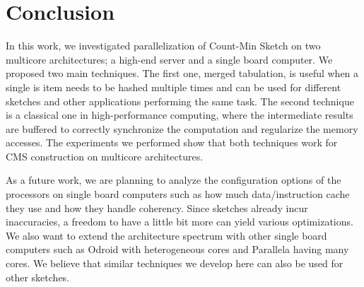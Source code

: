 \documentclass[10pt, conference, compsocconf]{IEEEtran}
\begin{document}
\section{Conclusion}\label{sec:con}

In this work, we investigated parallelization of Count-Min Sketch on two multicore architectures; a high-end server and a single board computer. We proposed two main techniques. The first one, merged tabulation, is useful when a single is item needs to be hashed multiple times and can be used for different sketches and other applications performing the same task. The second technique is a classical one in high-performance computing, where the intermediate results are buffered to correctly synchronize the computation and regularize the memory accesses. The experiments we performed show that both techniques work for CMS construction on multicore architectures.

As a future work, we are planning to analyze the configuration options of the processors on single board computers such as how much data/instruction cache they use and how they handle coherency. Since sketches already incur inaccuracies, a freedom to have a little bit more can yield various optimizations. We also want to extend the architecture spectrum with other single board computers such as Odroid with heterogeneous cores and Parallela having many cores. We believe that similar techniques we develop here can also be used for other sketches. 






    
\end{document}
